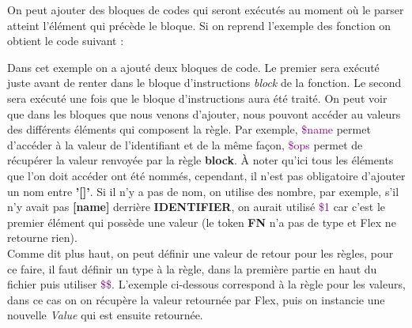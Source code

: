 \documentclass[a4paper]{article}%
\begin{document}
On peut ajouter des bloques de codes qui seront exécutés au moment où le
\gls{parser}
atteint l'élément qui précède le bloque. Si on reprend l'exemple des fonction on
obtient le code suivant :

\leavevmode\newline

Dans cet exemple on a ajouté deux bloques de code. Le premier sera exécuté juste
avant de renter dans le bloque d'instructions \textit{block} de la fonction. Le
second sera exécuté une fois que le bloque d'instructions aura été traité. On
peut voir que dans les bloques que nous venons d'ajouter, nous pouvont accéder
au valeurs des différents éléments qui composent la règle. Par exemple,
\textcolor{purple}{\$name} permet d'accéder à la valeur de l'identifiant et de la
même façon, \textcolor{purple}{\$ops} permet de récupérer la valeur renvoyée par
la règle \textbf{block}. À noter qu'ici tous les éléments que l'on doit accéder
ont été nommés, cependant, il n'est pas obligatoire d'ajouter un nom entre
\textbf{'[]'}. Si il n'y a pas de nom, on utilise des nombre, par exemple, s'il
n'y avait pas \textbf{[name]} derrière \textbf{IDENTIFIER}, on aurait utilisé
\textcolor{purple}{\$1} car c'est le premier élément qui possède une valeur (le
token \textbf{FN} n'a pas de type et Flex ne retourne rien).\\


Comme dit plus haut, on peut définir une valeur de retour pour les règles, pour
ce faire, il faut définir un type à la règle, dans la première partie en haut du
fichier puis utiliser \textcolor{purple}{\$\$}. L'exemple ci-dessous correspond
à la règle pour les valeurs, dans ce cas on on récupère la valeur retournée par
Flex, puis on instancie une nouvelle \textit{Value} qui est ensuite retournée.

\leavevmode\newline
\end{document}
